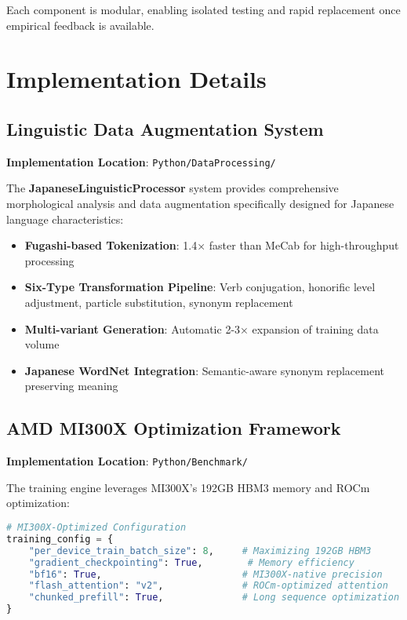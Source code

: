 \documentclass[12pt,a4paper]{article}
\begin{document}
Each component is modular, enabling isolated testing and rapid replacement once empirical feedback is available.

\section{Implementation Details}

\subsection{Linguistic Data Augmentation System}

\textbf{Implementation Location}: \texttt{Python/DataProcessing/}

The \textbf{JapaneseLinguisticProcessor} system provides comprehensive morphological analysis and data augmentation specifically designed for Japanese language characteristics:

\begin{itemize}
\item \textbf{Fugashi-based Tokenization}: 1.4× faster than MeCab for high-throughput processing
\item \textbf{Six-Type Transformation Pipeline}: Verb conjugation, honorific level adjustment, particle substitution, synonym replacement
\item \textbf{Multi-variant Generation}: Automatic 2-3× expansion of training data volume
\item \textbf{Japanese WordNet Integration}: Semantic-aware synonym replacement preserving meaning
\end{itemize}

\subsection{AMD MI300X Optimization Framework}

\textbf{Implementation Location}: \texttt{Python/Benchmark/}

The training engine leverages MI300X's 192GB HBM3 memory and ROCm optimization:

\begin{lstlisting}[language=Python, caption=MI300X-Optimized Configuration]
# MI300X-Optimized Configuration
training_config = {
    "per_device_train_batch_size": 8,     # Maximizing 192GB HBM3
    "gradient_checkpointing": True,        # Memory efficiency
    "bf16": True,                         # MI300X-native precision
    "flash_attention": "v2",              # ROCm-optimized attention
    "chunked_prefill": True,              # Long sequence optimization
}
\end{lstlisting}
\end{document}
